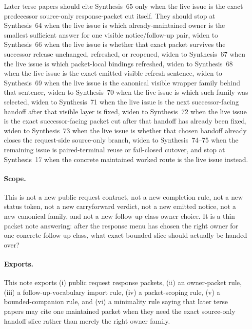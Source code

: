 \documentclass[11pt]{article}
\begin{document}
Later terse papers should cite Synthesis~65 only when the live issue is the exact predecessor source-only response-packet cut itself. They should stop at Synthesis~64 when the live issue is which already-maintained owner is the smallest sufficient answer for one visible notice/follow-up pair, widen to Synthesis~66 when the live issue is whether that exact packet survives the successor release unchanged, refreshed, or reopened, widen to Synthesis~67 when the live issue is which packet-local bindings refreshed, widen to Synthesis~68 when the live issue is the exact emitted visible refresh sentence, widen to Synthesis~69 when the live issue is the canonical visible wrapper family behind that sentence, widen to Synthesis~70 when the live issue is which such family was selected, widen to Synthesis~71 when the live issue is the next successor-facing handoff after that visible layer is fixed, widen to Synthesis~72 when the live issue is the exact successor-facing packet cut after that handoff has already been fixed, widen to Synthesis~73 when the live issue is whether that chosen handoff already closes the request-side source-only branch, widen to Synthesis~74--75 when the remaining issue is paired-terminal reuse or fail-closed cutover, and stop at Synthesis~17 when the concrete maintained worked route is the live issue instead.

\paragraph{Scope.}
This is not a new public request contract, not a new completion rule, not a new status token, not a new carryforward verdict, not a new emitted notice, not a new canonical family, and not a new follow-up-class owner choice.
It is a thin packet note answering: after the response menu has chosen the right owner for one concrete follow-up class, what exact bounded slice should actually be handed over?

\paragraph{Exports.}
This note exports (i) public request response packets, (ii) an owner-packet rule, (iii) a follow-up-vocabulary import rule, (iv) a packet-scoping rule, (v) a bounded-companion rule, and (vi) a minimality rule saying that later terse papers may cite one maintained packet when they need the exact source-only handoff slice rather than merely the right owner family.
\end{document}
